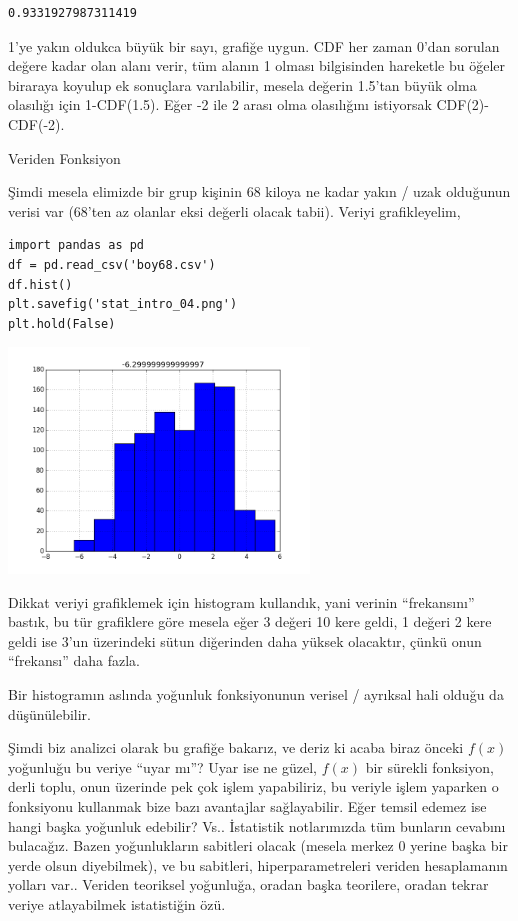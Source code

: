 \documentclass[12pt,fleqn]{article}\usepackage{../../common}
\begin{document}
\begin{verbatim}
0.9331927987311419
\end{verbatim}

1'ye yakın oldukca büyük bir sayı, grafiğe uygun. CDF her zaman 0'dan sorulan
değere kadar olan alanı verir, tüm alanın 1 olması bilgisinden hareketle bu
öğeler biraraya koyulup ek sonuçlara varılabilir, mesela değerin 1.5'tan büyük
olma olasılığı için 1-CDF(1.5). Eğer -2 ile 2 arası olma olasılığını istiyorsak
CDF(2)-CDF(-2).

Veriden Fonksiyon

Şimdi mesela elimizde bir grup kişinin 68 kiloya ne kadar yakın / uzak
olduğunun verisi var (68'ten az olanlar eksi değerli olacak tabii). Veriyi
grafikleyelim,

\begin{verbatim}
import pandas as pd
df = pd.read_csv('boy68.csv')
df.hist()
plt.savefig('stat_intro_04.png')
plt.hold(False)
\end{verbatim}

\includegraphics[height=6cm]{stat_intro_04.png}

Dikkat veriyi grafiklemek için histogram kullandık, yani verinin
``frekansını'' bastık, bu tür grafiklere göre mesela eğer 3 değeri 10 kere
geldi, 1 değeri 2 kere geldi ise 3'un üzerindeki sütun diğerinden daha
yüksek olacaktır, çünkü onun ``frekansı'' daha fazla.  

Bir histogramın aslında yoğunluk fonksiyonunun verisel / ayrıksal hali
olduğu da düşünülebilir.

Şimdi biz analizci olarak bu grafiğe bakarız, ve deriz ki acaba biraz önceki
$f(x)$ yoğunluğu bu veriye ``uyar mı''? Uyar ise ne güzel, $f(x)$ bir sürekli
fonksiyon, derli toplu, onun üzerinde pek çok işlem yapabiliriz, bu veriyle
işlem yaparken o fonksiyonu kullanmak bize bazı avantajlar sağlayabilir. Eğer
temsil edemez ise hangi başka yoğunluk edebilir?  Vs..  İstatistik notlarımızda
tüm bunların cevabını bulacağız. Bazen yoğunlukların sabitleri olacak (mesela
merkez 0 yerine başka bir yerde olsun diyebilmek), ve bu sabitleri,
hiperparametreleri veriden hesaplamanın yolları var.. Veriden teoriksel
yoğunluğa, oradan başka teorilere, oradan tekrar veriye atlayabilmek
istatistiğin özü.
\end{document}
